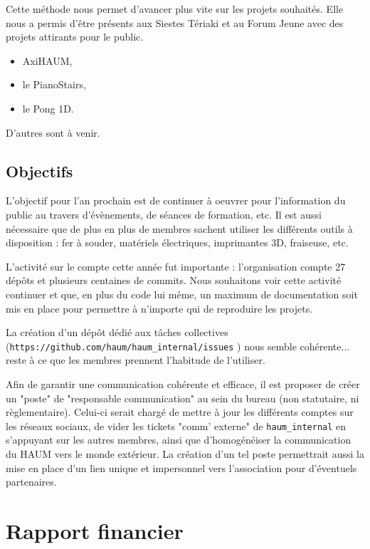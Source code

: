 \documentclass[11pt]{article}
\begin{document}
Cette méthode nous permet d'avancer plus vite sur les projets souhaités. Elle nous a permis d'être présents aux Siestes Tériaki et au Forum Jeune avec des projets attirants pour le public. 
    
\begin{itemize}
    \item AxiHAUM,
    \item le PianoStairs,
    \item le Pong 1D.
\end{itemize}

D'autres sont à venir.

\subsection{Objectifs}

L'objectif pour l'an prochain est de continuer à oeuvrer pour l'information du public au travers d'évènements, de séances de formation, etc.
Il est aussi nécessaire que de plus en plus de membres sachent utiliser les différents outils à disposition : fer à souder, matériels électriques, imprimantes 3D, fraiseuse, etc.

L'activité sur le compte cette année fut importante : l'organisation compte 27 dépôts et plusieurs centaines de commits. Nous souhaitons voir cette activité continuer et que, en plus du code lui même, un maximum de documentation soit mis en place pour permettre à n'importe qui de reproduire les projets.

La création d'un dépôt dédié aux tâches collectives (\texttt{https://github.com/haum/haum\_internal/issues} ) nous semble cohérente... reste à ce que les membres prennent l'habitude de l'utiliser.

Afin de garantir une communication cohérente et efficace, il est proposer de créer un "poste" de "responsable communication" au sein du bureau (non statutaire, ni règlementaire).
Celui-ci serait chargé de mettre à jour les différents comptes sur les réseaux sociaux, de vider les tickets "comm' externe" de \texttt{haum\_internal} en s'appuyant sur les autres
membres, ainsi que d'homogénéiser la communication du HAUM vers le monde extérieur. La création d'un tel poste permettrait aussi la mise en place d'un lien unique et impersonnel vers l'association pour d'éventuels partenaires.

\section{Rapport financier}
\end{document}
